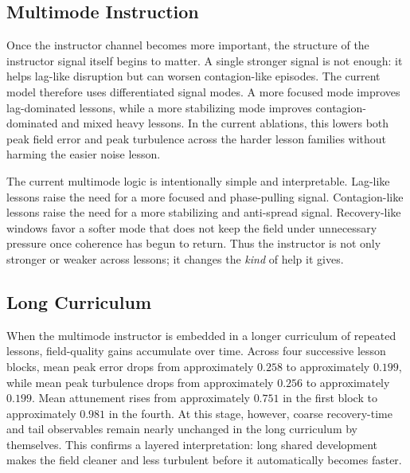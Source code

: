 \documentclass[12pt,a4paper]{article}
\begin{document}
\subsection{Multimode Instruction}
Once the instructor channel becomes more important, the structure of the instructor signal itself begins to matter. A single stronger signal is not enough: it helps lag-like disruption but can worsen contagion-like episodes. The current model therefore uses differentiated signal modes. A more focused mode improves lag-dominated lessons, while a more stabilizing mode improves contagion-dominated and mixed heavy lessons. In the current ablations, this lowers both peak field error and peak turbulence across the harder lesson families without harming the easier noise lesson.

The current multimode logic is intentionally simple and interpretable. Lag-like lessons raise the need for a more focused and phase-pulling signal. Contagion-like lessons raise the need for a more stabilizing and anti-spread signal. Recovery-like windows favor a softer mode that does not keep the field under unnecessary pressure once coherence has begun to return. Thus the instructor is not only stronger or weaker across lessons; it changes the \emph{kind} of help it gives.

\subsection{Long Curriculum}
When the multimode instructor is embedded in a longer curriculum of repeated lessons, field-quality gains accumulate over time. Across four successive lesson blocks, mean peak error drops from approximately $0.258$ to approximately $0.199$, while mean peak turbulence drops from approximately $0.256$ to approximately $0.199$. Mean attunement rises from approximately $0.751$ in the first block to approximately $0.981$ in the fourth. At this stage, however, coarse recovery-time and tail observables remain nearly unchanged in the long curriculum by themselves. This confirms a layered interpretation: long shared development makes the field cleaner and less turbulent before it automatically becomes faster.
\end{document}
